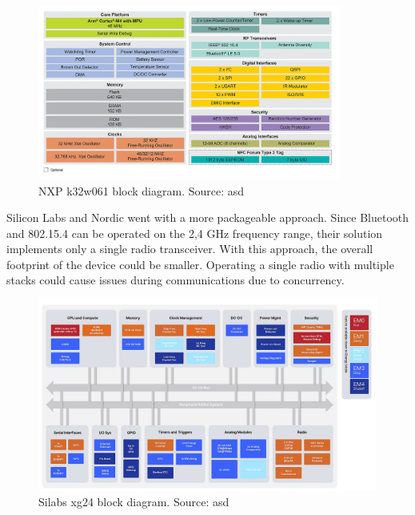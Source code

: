 \begin{figure}
    \centering
    \includegraphics[width=100mm, keepaspectratio]{figures/nxp_k32w061_41-block-dia.png}
    \caption{NXP k32w061 block diagram. Source: asd}
    \label{fig:mp:nxp-dia}
\end{figure}

Silicon Labs and Nordic went with a more packageable approach. Since Bluetooth and 802.15.4 can be operated on the 2,4 GHz frequency range, their solution implements only a single radio transceiver. With this approach, the overall footprint of the device could be smaller. Operating a single radio with multiple stacks could cause issues during communications due to concurrency.

\begin{figure}
    \centering
    \includegraphics[width=120mm, keepaspectratio]{figures/silabs_xg24-block-diagram.png}
    \caption{Silabs xg24 block diagram. Source: asd}
    \label{fig:mp:silabs-dia}
\end{figure}

